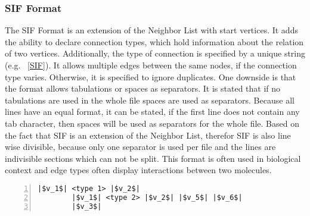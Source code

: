 \subsubsection{SIF Format}
The SIF Format is an extension of the Neighbor List with start vertices. It adds the ability to declare connection types, which hold information about the relation of two vertices. Additionally, the type of connection is specified by a unique string (e.g. ~\ref{SIF}). It allows multiple edges between the same nodes, if the connection type varies. Otherwise, it is specified to ignore duplicates. One downside is that the format allows tabulations or spaces as separators. It is stated that if no tabulations are used in the whole file spaces are used as separators. Because all lines have an equal format, it can be stated, if the first line does not contain any tab character, then spaces will be used as separators for the whole file. Based on the fact that SIF is an extension of the Neighbor List, therefor SIF is also line wise divisible, because only one separator is used per file and the lines are indivisible sections which can not be split. This format is often used in biological context and edge types often display interactions between two molecules.\cite{TheCytoscapeConsortium.2017}
\vspace{-7mm}
\begin{center}
	\begin{minipage}{.6\textwidth}
		\begin{lstlisting}[numbers=left,
		stepnumber=1,caption={Simple Graph on SIF Format},captionpos=b, linewidth={\textwidth}, escapeinside=||,gobble = 8,label={SIF}]
		|$v_1$| <type 1> |$v_2$|
		|$v_1$| <type 2> |$v_2$| |$v_5$| |$v_6$|
		|$v_3$|
		\end{lstlisting}
	\end{minipage}
\end{center}

